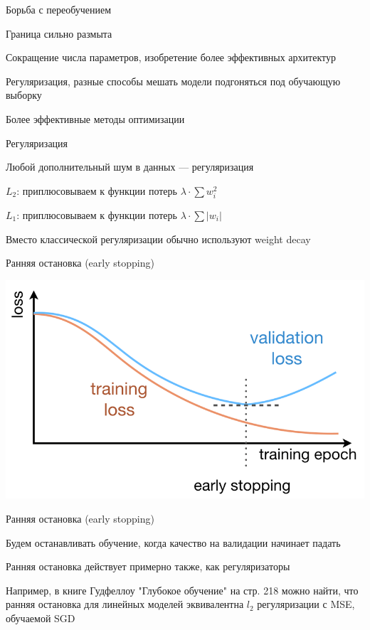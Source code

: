 \documentclass[notes,12pt, aspectratio=169]{beamer}
\newenvironment{wideitemize}{\itemize\addtolength{\itemsep}{10pt}}{\enditemize}
\begin{document}
\begin{frame}{Борьба с переобучением}
	\begin{wideitemize}
		\item Граница сильно размыта
		\item Сокращение числа параметров, изобретение более эффективных архитектур
		\item Регуляризация, разные способы мешать модели подгоняться под обучающую выборку
		\item Более эффективные методы оптимизации
	\end{wideitemize}
\end{frame}


\begin{frame}{Регуляризация}
	\begin{wideitemize}
		\item Любой дополнительный шум в данных — регуляризация
				
		\item $L_2$: приплюсовываем к функции потерь $\lambda \cdot \sum w_i^2$
		
		\item $L_1$: приплюсовываем к функции потерь $\lambda \cdot \sum |w_i|$
		
		\item Вместо классической регуляризации обычно используют weight decay
	\end{wideitemize}
\end{frame}


\begin{frame}{Ранняя остановка (early stopping)}
	\begin{center}
		\includegraphics[width=.7\linewidth]{early_stopping.png}
	\end{center}
\end{frame}


\begin{frame}{Ранняя остановка (early stopping)}
	\begin{wideitemize}
		\item  Будем останавливать обучение, когда качество на валидации начинает падать
		\item  Ранняя остановка действует примерно также, как регуляризаторы 
		\item  Например, в книге  Гудфеллоу "Глубокое обучение" на стр. 218 можно найти, что ранняя остановка для линейных моделей эквивалентна $l_2$ регуляризации с MSE, обучаемой SGD
	\end{wideitemize}
\end{frame}
\end{document}
